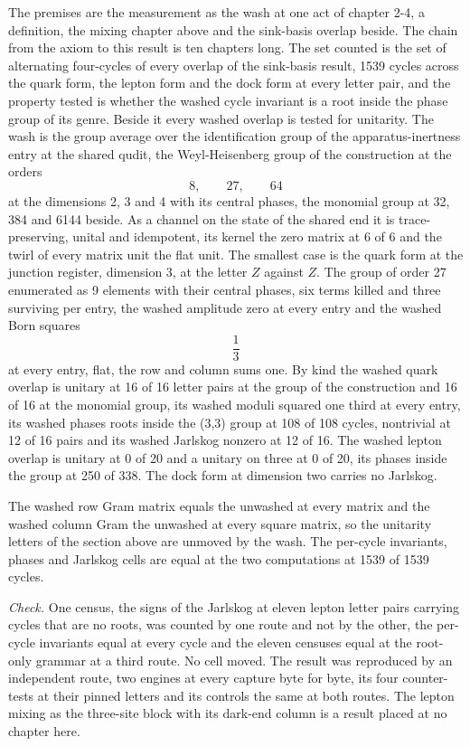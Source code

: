 \begin{chproof}[census]
The premises are the measurement as the wash at one act of chapter 2-4, a definition, the mixing chapter above and the sink-basis overlap beside. The chain from the axiom to this result is ten chapters long. The set counted is the set of alternating four-cycles of every overlap of the sink-basis result, 1539 cycles across the quark form, the lepton form and the dock form at every letter pair, and the property tested is whether the washed cycle invariant is a root inside the phase group of its genre. Beside it every washed overlap is tested for unitarity. The wash is the group average over the identification group of the apparatus-inertness entry at the shared qudit, the Weyl-Heisenberg group of the construction at the orders
\begin{equation}
8, \qquad 27, \qquad 64
\end{equation}
at the dimensions 2, 3 and 4 with its central phases, the monomial group at 32, 384 and 6144 beside. As a channel on the state of the shared end it is trace-preserving, unital and idempotent, its kernel the zero matrix at 6 of 6 and the twirl of every matrix unit the flat unit. The smallest case is the quark form at the junction register, dimension 3, at the letter $Z$ against $Z$. The group of order 27 enumerated as 9 elements with their central phases, six terms killed and three surviving per entry, the washed amplitude zero at every entry and the washed Born squares
\begin{equation}
\frac{1}{3}
\end{equation}
at every entry, flat, the row and column sums one. By kind the washed quark overlap is unitary at 16 of 16 letter pairs at the group of the construction and 16 of 16 at the monomial group, its washed moduli squared one third at every entry, its washed phases roots inside the (3,3) group at 108 of 108 cycles, nontrivial at 12 of 16 pairs and its washed Jarlskog nonzero at 12 of 16. The washed lepton overlap is unitary at 0 of 20 and a unitary on three at 0 of 20, its phases inside the group at 250 of 338. The dock form at dimension two carries no Jarlskog.

The washed row Gram matrix equals the unwashed at every matrix and the washed column Gram the unwashed at every square matrix, so the unitarity letters of the section above are unmoved by the wash. The per-cycle invariants, phases and Jarlskog cells are equal at the two computations at 1539 of 1539 cycles.

\emph{Check.} One census, the signs of the Jarlskog at eleven lepton letter pairs carrying cycles that are no roots, was counted by one route and not by the other, the per-cycle invariants equal at every cycle and the eleven censuses equal at the root-only grammar at a third route. No cell moved. The result was reproduced by an independent route, two engines at every capture byte for byte, its four counter-tests at their pinned letters and its controls the same at both routes.
The lepton mixing as the three-site block with its dark-end column is a result placed at no chapter here.
\end{chproof}
\label{chend:VI-7-D538551-w-mxws}
